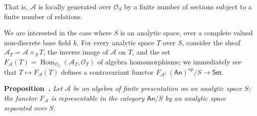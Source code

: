 \documentclass[british]{article}
\newenvironment{itenv}[1]
  {\phantomsection\par\smallskip\noindent\textbf{#1.}\itshape}
  {\par\smallskip}
\begin{document}
That is, \({\mathscr{A}}\) is locally generated over \({\mathscr{O}}_S\)
by a finite number of sections subject to a finite number of relations.

We are interested in the case where \(S\) is an analytic space, over a
complete valued non-discrete base field \(k\). For every analytic space
\(T\) over \(S\), consider the sheaf
\({\mathscr{A}}_T={\mathscr{A}}\times_S T\), the inverse image of
\({\mathscr{A}}\) on \(T\), and the set
\(F_{\mathscr{A}}(T)=\operatorname{Hom}_{{\mathscr{O}}_T}({\mathscr{A}}_T,{\mathscr{O}}_T)\)
of algebra homomorphisms; we immediately see that
\(T\mapsto F_{\mathscr{A}}(T)\) defines a contravariant functor
\(F_{\mathscr{A}}\colon(\mathsf{An})^\mathrm{op}/S\to\mathsf{Set}\).

\protect{}\label{proposition-1}
\begin{itenv}{Proposition }
Let \({\mathscr{A}}\) be an algebra of finite presentation on an
analytic space \(S\); the functor \(F_{\mathscr{A}}\) is representable
in the category \(\mathsf{An}/S\) by an analytic space separated over
\(S\).

\end{itenv}
\end{document}
